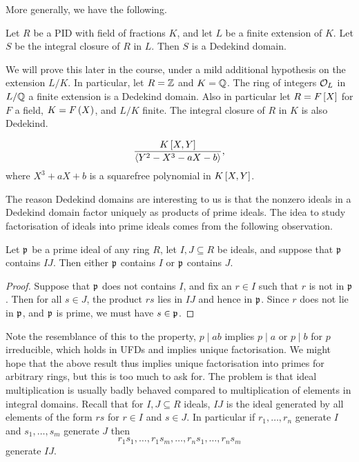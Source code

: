 More generally, we have the following.

\begin{theorem}
Let $ R $ be a PID with field of fractions $ K $, and let $ L $ be a finite extension of $ K $. Let $ S $ be the integral closure of $ R $ in $ L $. Then $ S $ is a Dedekind domain.
\end{theorem}

We will prove this later in the course, under a mild additional hypothesis on the extension $ L / K $. In particular, let $ R = \mathbb{Z} $ and $ K = \mathbb{Q} $. The ring of integers $ \mathcal{O}_L $ in $ L / \mathbb{Q} $ a finite extension is a Dedekind domain. Also in particular let $ R = F\sbr{X} $ for $ F $ a field, $ K = F\br{X} $, and $ L / K $ finite. The integral closure of $ R $ in $ K $ is also Dedekind.

\begin{example*}
$$ \dfrac{K\sbr{X, Y}}{\abr{Y^2 - X^3 - aX - b}}, $$
where $ X^3 + aX + b $ is a squarefree polynomial in $ K\sbr{X, Y} $.
\end{example*}

The reason Dedekind domains are interesting to us is that the nonzero ideals in a Dedekind domain factor uniquely as products of prime ideals. The idea to study factorisation of ideals into prime ideals comes from the following observation.

\begin{lemma}
\label{lem:11.1.3}
Let $ \mathfrak{p} $ be a prime ideal of any ring $ R $, let $ I, J \subseteq R $ be ideals, and suppose that $ \mathfrak{p} $ contains $ IJ $. Then either $ \mathfrak{p} $ contains $ I $ or $ \mathfrak{p} $ contains $ J $.
\end{lemma}

\begin{proof}
Suppose that $ \mathfrak{p} $ does not contains $ I $, and fix an $ r \in I $ such that $ r $ is not in $ \mathfrak{p} $. Then for all $ s \in J $, the product $ rs $ lies in $ IJ $ and hence in $ \mathfrak{p} $. Since $ r $ does not lie in $ \mathfrak{p} $, and $ \mathfrak{p} $ is prime, we must have $ s \in \mathfrak{p} $.
\end{proof}

\pagebreak

Note the resemblance of this to the property, $ p \mid ab $ implies $ p \mid a $ or $ p \mid b $ for $ p $ irreducible, which holds in UFDs and implies unique factorisation. We might hope that the above result thus implies unique factorisation into primes for arbitrary rings, but this is too much to ask for. The problem is that ideal multiplication is usually badly behaved compared to multiplication of elements in integral domains. Recall that for $ I, J \subseteq R $ ideals, $ IJ $ is the ideal generated by all elements of the form $ rs $ for $ r \in I $ and $ s \in J $. In particular if $ r_1, \dots, r_n $ generate $ I $ and $ s_1, \dots, s_m $ generate $ J $ then
$$ r_1s_1, \dots, r_1s_m, \dots, r_ns_1, \dots, r_ns_m $$
generate $ IJ $.

